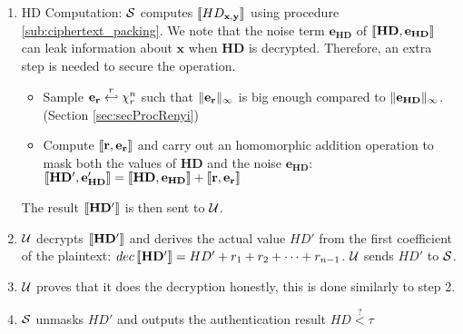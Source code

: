 \begin{description}
\begin{enumerate}
\item HD Computation: $\mathcal{S}$ computes $\left\llbracket HD_{\mathbf{x,y}}\right\rrbracket$ using
  procedure \ref{sub:ciphertext_packing}. We note that the noise term
  $\mathbf{e_{HD}}$ of $\left\llbracket\mathbf{HD,e_{HD}}\right\rrbracket$ can leak information about
  $\mathbf{x}$ when $\mathbf{HD}$ is decrypted. Therefore, an extra step is
  needed to secure the operation.
  \begin{itemize}
  \item Sample $\mathbf{e_{r}} \stackrel{r}{\hookleftarrow} \chi_{r}^n$ such that
    $\Vert \mathbf{e_r} \Vert_{\infty}$ is big enough compared to
    $\Vert \mathbf{e_{HD}} \Vert_{\infty}$.(Section \ref{sec:secProcRenyi})
  \item Compute $\left\llbracket\mathbf{r,e_r}\right\rrbracket$ and carry out an homomorphic addition
    operation to mask both the values of $\mathbf{HD}$ and the noise
    $\mathbf{e_{HD}}$:
    $\left\llbracket\mathbf{HD', e'_{HD}}\right\rrbracket = \left\llbracket\mathbf{HD, e_{HD}}\right\rrbracket +
    \left\llbracket\mathbf{r,e_r}\right\rrbracket$
    \end{itemize}
    The result $\left\llbracket\mathbf{HD'}\right\rrbracket$ is then sent to $\mathcal{U}$.
  \item \(\mathcal{U}\) decrypts $\left\llbracket\mathbf{HD'}\right\rrbracket$ and derives the actual value
    ${HD'}$ from the first coefficient of the plaintext:
    \( dec\left\llbracket\mathbf{HD'}\right\rrbracket = HD' + r_1 + r_2 + \dots + r_{n-1} \). \(\mathcal{U}\)
    sends \(HD'\) to \(\mathcal{S}\).
  \item \(\mathcal{U}\) proves that it does the decryption honestly, this is done
    similarly to step 2.
  \item \(\mathcal{S}\) unmasks \(HD'\) and outputs the authentication result
    \(HD \stackrel{?}{<} \tau\)
  \end{enumerate}

\end{description}

